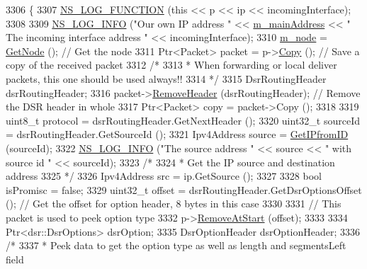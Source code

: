 \begin{DoxyCode}
3306 \{
3307   \hyperlink{log-macros-disabled_8h_a90b90d5bad1f39cb1b64923ea94c0761}{NS\_LOG\_FUNCTION} (\textcolor{keyword}{this} << p << ip << incomingInterface);
3308 
3309   \hyperlink{group__logging_gafbd73ee2cf9f26b319f49086d8e860fb}{NS\_LOG\_INFO} (\textcolor{stringliteral}{"Our own IP address "} << \hyperlink{classns3_1_1dsr_1_1DsrRouting_a73182b5edee2d8460f28855e058fc9a0}{m\_mainAddress} << \textcolor{stringliteral}{" The incoming interface
       address "} << incomingInterface);
3310   \hyperlink{classns3_1_1dsr_1_1DsrRouting_ac27df0103a40973f0a3f78af0092c60d}{m\_node} = \hyperlink{classns3_1_1dsr_1_1DsrRouting_af1ef6f867481d19a85863a75a3e72e5a}{GetNode} ();                        \textcolor{comment}{// Get the node}
3311   Ptr<Packet> packet = p->\hyperlink{classns3_1_1Packet_a5d5c70802a5f77fc5f0001e0cfc1898b}{Copy} ();            \textcolor{comment}{// Save a copy of the received packet}
3312   \textcolor{comment}{/*}
3313 \textcolor{comment}{   * When forwarding or local deliver packets, this one should be used always!!}
3314 \textcolor{comment}{   */}
3315   DsrRoutingHeader dsrRoutingHeader;
3316   packet->\hyperlink{classns3_1_1Packet_a0961eccf975d75f902d40956c93ba63e}{RemoveHeader} (dsrRoutingHeader);          \textcolor{comment}{// Remove the DSR header in whole}
3317   Ptr<Packet> copy = packet->Copy ();
3318 
3319   uint8\_t protocol = dsrRoutingHeader.GetNextHeader ();
3320   uint32\_t sourceId = dsrRoutingHeader.GetSourceId ();
3321   Ipv4Address source = \hyperlink{classns3_1_1dsr_1_1DsrRouting_abaf6e655b3bf50d3002c3739409d23a6}{GetIPfromID} (sourceId);
3322   \hyperlink{group__logging_gafbd73ee2cf9f26b319f49086d8e860fb}{NS\_LOG\_INFO} (\textcolor{stringliteral}{"The source address "} << source << \textcolor{stringliteral}{" with source id "} << sourceId);
3323   \textcolor{comment}{/*}
3324 \textcolor{comment}{   * Get the IP source and destination address}
3325 \textcolor{comment}{   */}
3326   Ipv4Address src = ip.GetSource ();
3327 
3328   \textcolor{keywordtype}{bool} isPromisc = \textcolor{keyword}{false};
3329   uint32\_t offset = dsrRoutingHeader.GetDsrOptionsOffset ();        \textcolor{comment}{// Get the offset for option header, 8
       bytes in this case}
3330 
3331   \textcolor{comment}{// This packet is used to peek option type}
3332   p->\hyperlink{classns3_1_1Packet_a78aa207e7921dd2f9f7e0d0b7a1c730a}{RemoveAtStart} (offset);
3333 
3334   Ptr<dsr::DsrOptions> dsrOption;
3335   DsrOptionHeader dsrOptionHeader;
3336   \textcolor{comment}{/*}
3337 \textcolor{comment}{   * Peek data to get the option type as well as length and segmentsLeft field}

\end{DoxyCode}
